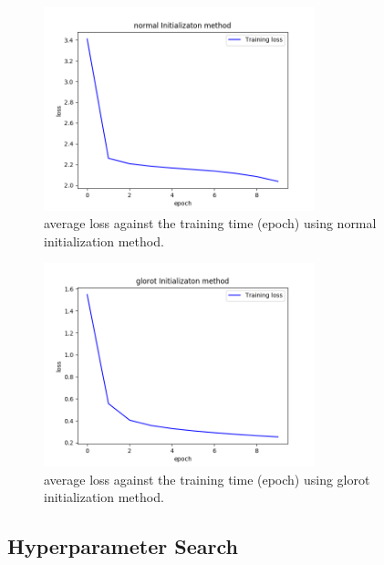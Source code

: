 \documentclass[a4paper]{article}
\begin{document}
\begin{figure}
\centering
\includegraphics[width=0.7\textwidth]{normal_init.png}
\caption{\label{fig:init2}average loss against the training time (epoch) using normal initialization method.}
\end{figure}

\begin{figure}
\centering
\includegraphics[width=0.7\textwidth]{glorot_init.png}
\caption{\label{fig:init3}average loss against the training time (epoch) using glorot initialization method.}
\end{figure}

\subsection{Hyperparameter Search}
\end{document}
